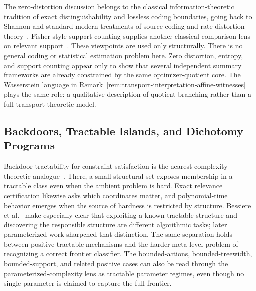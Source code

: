 The zero-distortion discussion belongs to the classical information-theoretic tradition of exact distinguishability and lossless coding boundaries, going back to Shannon and standard modern treatments of source coding and rate-distortion theory~\cite{shannon1948mathematical,shannon1956zero,shannon1959coding,cover2006elements}. Fisher-style support counting supplies another classical comparison lens on relevant support~\cite{fisher1922mathematical}. These viewpoints are used only structurally. There is no general coding or statistical estimation problem here. Zero distortion, entropy, and support counting appear only to show that several independent summary frameworks are already constrained by the same optimizer-quotient core. The Wasserstein language in Remark~\ref{rem:transport-interpretation-affine-witnesses} plays the same role: a qualitative description of quotient branching rather than a full transport-theoretic model.

\subsection*{Backdoors, Tractable Islands, and Dichotomy Programs}

Backdoor tractability for constraint satisfaction is the nearest complexity-theoretic analogue~\cite{williams2003backdoors,bessiere2013detecting,ganian2017discovering}. There, a small structural set exposes membership in a tractable class even when the ambient problem is hard. Exact relevance certification likewise asks which coordinates matter, and polynomial-time behavior emerges when the source of hardness is restricted by structure. Bessiere et al.~\cite{bessiere2013detecting} make especially clear that exploiting a known tractable structure and discovering the responsible structure are different algorithmic tasks; later parameterized work sharpened that distinction. The same separation holds between positive tractable mechanisms and the harder meta-level problem of recognizing a correct frontier classifier. The bounded-actions, bounded-treewidth, bounded-support, and related positive cases can also be read through the parameterized-complexity lens as tractable parameter regimes, even though no single parameter is claimed to capture the full frontier.

